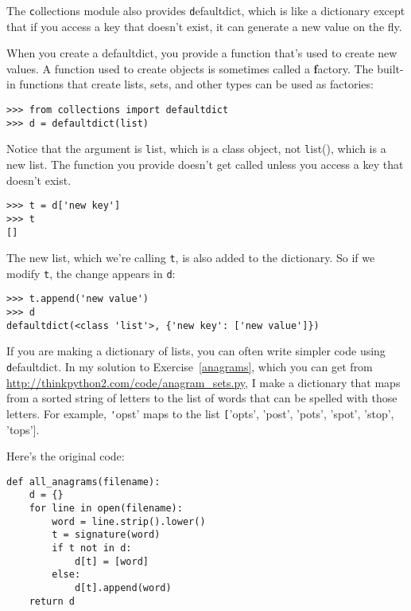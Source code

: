 \documentclass[
DIV=11,
fontsize=13,
twoside,
headinclude=false,
titlepage=firstiscover,
abstract=true,
headsepline=true,
footsepline=true,
chapterprefix=true, %
headings=big,
bibliography=totoc,%
captions=tableheading
]{scrbook}
\theoremstyle{definition}
\begin{document}
The {\texttt collections} module also provides {\texttt defaultdict}, which is
like a dictionary except that if you access a key that doesn't exist,
it can generate a new value on the fly.

When you create a defaultdict, you provide a function that's used to
create new values.  A function used to create objects is sometimes
called a {\textbf factory}.  The built-in functions that create lists, sets,
and other types can be used as factories:

\begin{lstlisting}
>>> from collections import defaultdict
>>> d = defaultdict(list)
\end{lstlisting}

Notice that the argument is {\texttt list}, which is a class object,
not {\texttt list()}, which is a new list.  The function you provide
doesn't get called unless you access a key that doesn't exist.

\begin{lstlisting}
>>> t = d['new key']
>>> t
[]
\end{lstlisting}

The new list, which we're calling {\texttt t}, is also added to the
dictionary.  So if we modify {\texttt t}, the change appears in {\texttt d}:

\begin{lstlisting}
>>> t.append('new value')
>>> d
defaultdict(<class 'list'>, {'new key': ['new value']})
\end{lstlisting}

If you are making a dictionary of lists, you can often write simpler
code using {\texttt defaultdict}.  In my solution to
Exercise~\ref{anagrams}, which you can get from
\url{http://thinkpython2.com/code/anagram_sets.py}, I make a
dictionary that maps from a sorted string of letters to the list of
words that can be spelled with those letters.  For example, {\texttt
  'opst'} maps to the list {\texttt ['opts', 'post', 'pots', 'spot',
    'stop', 'tops']}.

Here's the original code:

\begin{lstlisting}
def all_anagrams(filename):
    d = {}
    for line in open(filename):
        word = line.strip().lower()
        t = signature(word)
        if t not in d:
            d[t] = [word]
        else:
            d[t].append(word)
    return d
\end{lstlisting}
\end{document}
